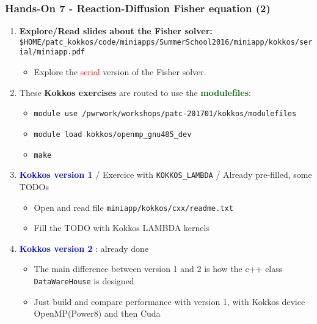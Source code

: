 \begin{frame}
  \frametitle{Hands-On 7 - Reaction-Diffusion Fisher equation (2)}

  \begin{enumerate}
  \item \textbf{Explore/Read slides about the Fisher solver:}\\
    {\footnotesize \texttt{\$HOME/patc\_kokkos/code/miniapps/SummerSchool2016/miniapp/kokkos/serial/miniapp.pdf}}
    \begin{itemize}
    \item Explore the \textcolor{red}{serial} version of the Fisher solver.
    \end{itemize}
  \item These \textbf{Kokkos exercises} are routed to use the \textcolor{darkgreen}{\textbf{modulefiles}}:
    \begin{itemize}
    \item \texttt{module use /pwrwork/workshops/patc-201701/kokkos/modulefiles}
    \item \texttt{module load kokkos/openmp\_gnu485\_dev}
    \item \texttt{make}
    \end{itemize}
  \item \textcolor{blue}{\textbf{Kokkos version 1}} / Exercice with \texttt{KOKKOS\_LAMBDA} / Already pre-filled, some TODOs
    \begin{itemize}
    \item Open and read file \texttt{miniapp/kokkos/cxx/readme.txt}
    \item Fill the TODO with Kokkos LAMBDA kernels
    \end{itemize}
  \item \textcolor{blue}{\textbf{Kokkos version 2}} : already done
    \begin{itemize}
    \item The main difference between version 1 and 2 is how the c++ class \texttt{DataWareHouse} is designed
    \item Just build and compare performance with version 1, with Kokkos device OpenMP(Power8) and then Cuda
    \end{itemize}
  \end{enumerate}
\end{frame}
